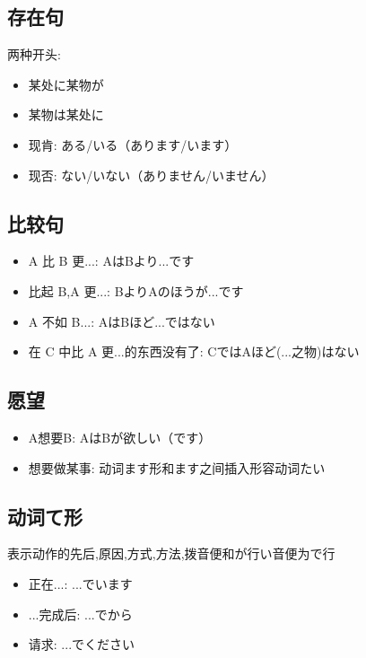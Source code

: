         \subsection{存在句}
        两种开头:
        \begin{itemize}
            \item 某处に某物が
            \item 某物は某处に
        \end{itemize}
        \begin{itemize}
            \item 现肯: ある/いる（あります/います）
            \item 现否: ない/いない（ありません/いません）
        \end{itemize}
        \subsection{比较句}
        \begin{itemize}
            \item A 比 B 更...: AはBより...です
            \item 比起 B,A 更...: BよりAのほうが...です
            \item A 不如 B...: AはBほど...ではない
            \item 在 C 中比 A 更...的东西没有了: CではAほど(...之物)はない
        \end{itemize}
        \subsection{愿望}
        \begin{itemize}
            \item A想要B: AはBが欲しい（です）
            \item 想要做某事: 动词ます形和ます之间插入形容动词たい
        \end{itemize}
        \subsection{动词て形}
        表示动作的先后,原因,方式,方法,拨音便和が行い音便为で行
        \begin{itemize}
            \item 正在...: ...でいます
            \item ...完成后: ...でから
            \item 请求: ...でください
        \end{itemize}
